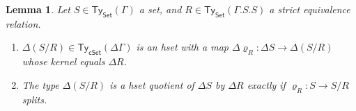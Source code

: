 \documentclass[10pt,a4paper]{article}
\newtheorem{lemma}[theorem]{Lemma}
\theoremstyle{definition}
\theoremstyle{remark}
\newcommand{\Set}{\mathsf{Set}}
\newcommand{\cSet}{\mathsf{cSet}}
\newcommand\Ty{\mathsf{Ty}}
\begin{document}
\begin{lemma}\label{prop:set-quotient-is-hset-quotient-iff-surjection-splits}
  Let \(S \in \Ty_{\Set}(\Gamma)\) a set, and \(R \in \Ty_{\Set}(\Gamma.S.S)\) a strict equivalence relation.
  \begin{enumerate}[label=(\arabic*)]
    \item\label{prop:set-quotient-is-hset-quotient-iff-surjection-splits:well-defined}
      \(\Delta(S/R) \in \Ty_{\cSet}(\Delta\Gamma)\) is an hset with a map \(\Delta\varrho_{R} \colon \Delta S \to \Delta(S/R)\) whose kernel equals \(\Delta R\). 
    \item\label{prop:set-quotient-is-hset-quotient-iff-surjection-splits:characterization}
      The type \(\Delta(S/R)\) is a hset quotient of \(\Delta S\) by \(\Delta R\) exactly if \(\varrho_{R} \colon S \to S/R\) splits.
    \end{enumerate}  
\end{lemma}
\end{document}

